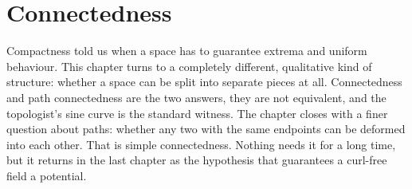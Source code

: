 \chapter{Connectedness}
\label{ch:connectedness}

Compactness told us when a space has  to guarantee extrema and uniform
behaviour. This chapter turns to a completely different, qualitative kind of structure: whether a
space can be split into separate pieces at all. Connectedness and path connectedness are the two
answers, they are not equivalent, and the topologist's sine curve is the standard witness. The
chapter closes with a finer question about paths: whether any two with the same endpoints can be
deformed into each other. That is simple connectedness. Nothing needs it for a long time, but it
returns in the last chapter as the hypothesis that guarantees a curl-free field a potential.




